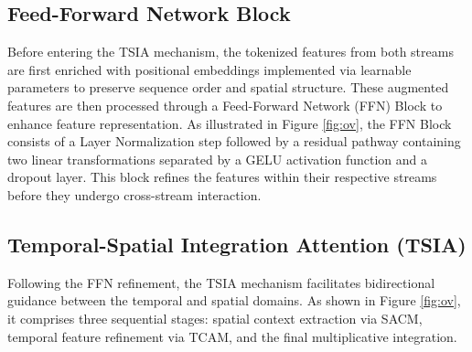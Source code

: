 \documentclass[journal]{IEEEtran}
\theoremstyle{plain}
\begin{document}
\subsection{Feed-Forward Network Block}
Before entering the TSIA mechanism, the tokenized features from both streams are first enriched with positional embeddings implemented via learnable parameters to preserve sequence order and spatial structure. These augmented features are then processed through a Feed-Forward Network (FFN) Block to enhance feature representation. As illustrated in Figure \ref{fig:ov}, the FFN Block consists of a Layer Normalization step followed by a residual pathway containing two linear transformations separated by a GELU activation function and a dropout layer. This block refines the features within their respective streams before they undergo cross-stream interaction.

\subsection{Temporal-Spatial Integration Attention (TSIA)}
Following the FFN refinement, the TSIA mechanism facilitates bidirectional guidance between the temporal and spatial domains. As shown in Figure \ref{fig:ov}, it comprises three sequential stages: spatial context extraction via SACM, temporal feature refinement via TCAM, and the final multiplicative integration.
\end{document}
